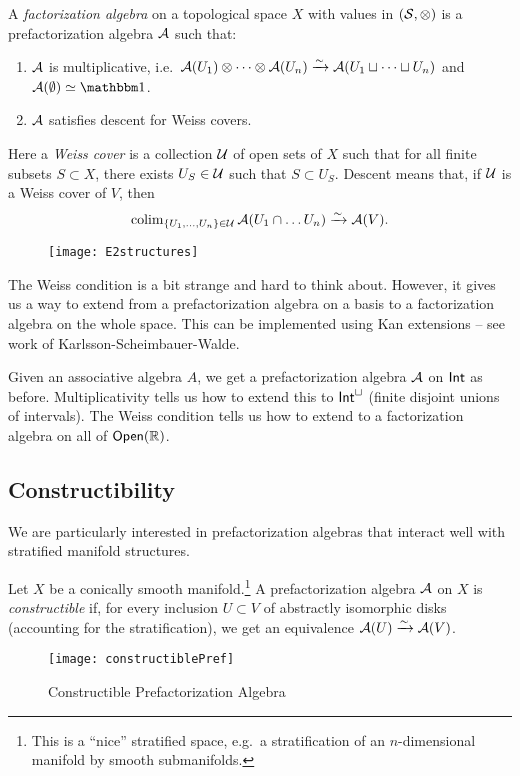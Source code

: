 \begin{dfn}
	A \emph{factorization algebra} on a topological space $X$ with values in $(\mathcal{S}, \otimes)$ is a prefactorization algebra $\mathcal{A}$ such that:
	\begin{enumerate}
		\item $\mathcal{A}$ is multiplicative, i.e.\ $\mathcal{A}(U_1) \otimes \dots \otimes \mathcal{A}(U_n) \xrightarrow{\sim} \mathcal{A}(U_1 \sqcup \dots \sqcup U_n)$ and $\Ac(\emptyset) \simeq \onebb$.
		\item $\mathcal{A}$ satisfies descent for Weiss covers.
	\end{enumerate}
	Here a \emph{Weiss cover} is a collection $\mathcal{U}$ of open sets of $X$ such that for all finite subsets $S \subset X$, there exists $U_S \in \mathcal{U}$ such that $S \subset U_S$.
	Descent means that, if $\mathcal{U}$ is a Weiss cover of $V$, then
	\[
		\operatorname{colim}_{\{ U_1, \dots, U_n \} \in \mathcal{U}} \mathcal{A}(U_1 \cap \dots U_n) \xrightarrow{\sim} \mathcal{A}(V).
	\]
\end{dfn}
\begin{figure}[h]
	\centering
	\texttt{[image: E2structures]}
	\label{fig:E2structures}
\end{figure}

The Weiss condition is a bit strange and hard to think about.
However, it gives us a way to extend from a prefactorization algebra on a basis to a factorization algebra on the whole space.
This can be implemented using Kan extensions -- see work of Karlsson-Scheimbauer-Walde.

\begin{ex}
	Given an associative algebra $A$, we get a prefactorization algebra $\mathcal{A}$ on $\mathsf{Int}$ as before.
	Multiplicativity tells us how to extend this to $\mathsf{Int}^{\sqcup}$ (finite disjoint unions of intervals).
	The Weiss condition tells us how to extend to a factorization algebra on all of $\mathsf{Open}(\mathbb{R})$.
\end{ex}

\subsection{Constructibility}

We are particularly interested in prefactorization algebras that interact well with stratified manifold structures.

\begin{dfn}
	Let $X$ be a conically smooth manifold.\footnote{This is a ``nice'' stratified space, e.g.\ a stratification of an $n$-dimensional manifold by smooth submanifolds.}
	A prefactorization algebra $\mathcal{A}$ on $X$ is \emph{constructible} if, for every inclusion $U \subset V$ of abstractly isomorphic disks (accounting for the stratification), we get an equivalence $\mathcal{A}(U) \xrightarrow{\sim} \mathcal{A}(V)$.
\end{dfn}
\begin{figure}[h]
	\centering
	\texttt{[image: constructiblePref]}
	\caption{Constructible Prefactorization Algebra}
	\label{fig:constructiblePref}
\end{figure}


